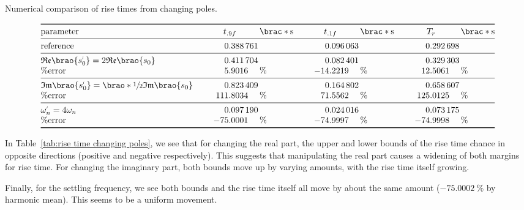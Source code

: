 \documentclass[12pt]{article}
\DeclarePairedDelimiter\brao()%
\DeclarePairedDelimiter\brac[]%
\newcommand{\setprime}[2][1]{%
    {#2}^{%
        \raisebox{1pt}{%
            \scalebox{0.5}{%
                \itshape\sffamily\uppercase%
                \expandafter{%
                    \romannumeral#1%
                }%
            }%
        }
    }%
}%
\begin{document}
\begin{table}[]
    \centering
    \caption{Numerical comparison of rise times from changing poles.}
    \[
        \begin{array}{@{}>$l<$*3{S@{\,}l}@{}}
        \toprule
            \text{parameter}
                & t_{.9f} & \brac*{\si\second}
                & t_{.1f} & \brac*{\si\second}
                & T_r & \brac*{\si\second}
        \\*
        \midrule
            \text{reference}
            & 0.388761 &
            & 0.096063 &
            & 0.292698
        \\*
        \midrule
            $\mathfrak{Re}\brao{\setprime{s}_0} = 2\mathfrak{Re}\brao{s_0}$
            & 0.411704 &
            & 0.082401 &
            & 0.329303
        \\*
            \%error
            & +5.9016 & \si\percent
            & -14.2219 & \si\percent
            & +12.5061 & \si\percent
        \\*
        \midrule
            $\mathfrak{Im}\brao{\setprime{s}_0} = \brao*{\sfrac12}\mathfrak{Im}\brao{s_0}$
            & 0.823409 &
            & 0.164802 &
            & 0.658607
        \\*
            \%error
            & +111.8034 & \si\percent
            & +71.5562 & \si\percent
            & +125.0125 & \si\percent
        \\*
        \midrule
            $\setprime\omega_n = 4\omega_n$
            & 0.097190 &
            & 0.024016 &
            & 0.073175
        \\*
            \%error
            & -75.0001 & \si\percent
            & -74.9997 & \si\percent
            & -74.9998 & \si\percent
        \\*
        \bottomrule
        \end{array}
    \]
    \label{tab:rise time changing poles}
\end{table}

In Table~\ref{tab:rise time changing poles}, we see that for changing the real part, the upper and lower bounds of the rise time chance in opposite directions (positive and negative respectively). This suggests that manipulating the real part causes a widening of both margins for rise time. For changing the imaginary part, both bounds move up by varying amounts, with the rise time itself growing.

Finally, for the settling frequency, we see both bounds and the rise time itself all move by about the same amount ($\SI{-75.0002}\percent$ by harmonic mean). This seems to be a uniform movement.
\end{document}
